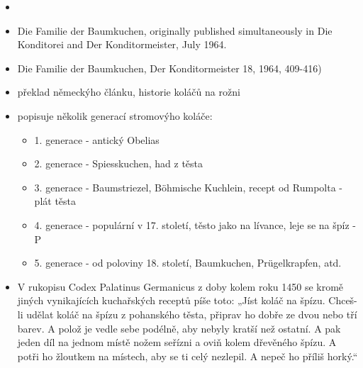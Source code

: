 \begin{itemize}
  \begin{itemize}
  \tightlist
  \item
  \item
    Die Familie der Baumkuchen, originally published simultaneously in
    Die Konditorei and Der Konditormeister, July 1964.
  \item
    Die Familie der Baumkuchen, Der Konditormeister 18, 1964, 409-416)
  \item
    překlad německýho článku, historie koláčů na rožni
  \item
    popisuje několik generací stromovýho koláče:

    \begin{itemize}
    \tightlist
    \item
      1. generace - antický Obelias
    \item
      2. generace - Spiesskuchen, had z těsta
    \item
      3. generace - Baumstriezel, Böhmische Kuchlein, recept od Rumpolta
      - plát těsta
    \item
      4. generace - populární v 17. století, těsto jako na lívance, leje
      se na špíz - P
    \item
      5. generace - od poloviny 18. století, Baumkuchen, Prügelkrapfen,
      atd.
    \end{itemize}
  \item
    V rukopisu Codex Palatinus Germanicus z doby kolem roku 1450 se
    kromě jiných vynikajících kuchařských receptů píše toto: „Jíst koláč
    na špízu. Chceš-li udělat koláč na špízu z pohanského těsta, připrav
    ho dobře ze dvou nebo tří barev. A polož je vedle sebe podélně, aby
    nebyly kratší než ostatní. A pak jeden díl na jednom místě nožem
    seřízni a oviň kolem dřevěného špízu. A potři ho žloutkem na
    místech, aby se ti celý nezlepil. A nepeč ho příliš horký.``


\end{itemize}
\end{itemize}
